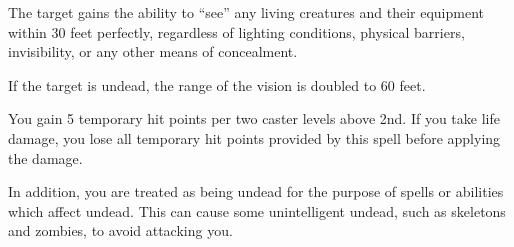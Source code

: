 \begin{spellheader}
    \begin{spelltargetinginfo}
    \end{spelltargetinginfo}
\end{spellheader}
\begin{spellcontent}
    \begin{spelleffects}
        \spelleffect The target gains the ability to ``see'' any living creatures and their equipment within 30 feet perfectly, regardless of lighting conditions, physical barriers, invisibility, or any other means of concealment.

        If the target is undead, the range of the vision is doubled to 60 feet.
        \spelldur{\durlong \dismissable}
    \end{spelleffects}
\end{spellcontent}
\begin{spellfooter}

\end{spellfooter}

\begin{spellheader}
    \begin{spelltargetinginfo}
    \end{spelltargetinginfo}
\end{spellheader}
\begin{spellcontent}
    \begin{spelleffects}
        \spelleffect You gain 5 temporary hit points  per two caster levels above 2nd. If you take life damage, you lose all temporary hit points provided by this spell before applying the damage.

        In addition, you are treated as being undead for the purpose of spells or abilities which affect undead. This can cause some unintelligent undead, such as skeletons and zombies, to avoid attacking you.
        \spelldur{\durlong}
    \end{spelleffects}
\end{spellcontent}
\begin{spellfooter}

\end{spellfooter}

